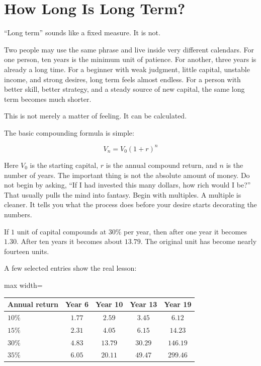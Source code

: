 \chapter{How Long Is Long Term?}

``Long term'' sounds like a fixed measure. It is not.

Two people may use the same phrase and live inside very different calendars. For one person, ten years is the minimum unit of patience. For another, three years is already a long time. For a beginner with weak judgment, little capital, unstable income, and strong desires, long term feels almost endless. For a person with better skill, better strategy, and a steady source of new capital, the same long term becomes much shorter.

This is not merely a matter of feeling. It can be calculated.

The basic compounding formula is simple:

\[
V_n=V_0(1+r)^n
\]

Here \(V_0\) is the starting capital, \(r\) is the annual compound return, and \(n\) is the number of years. The important thing is not the absolute amount of money. Do not begin by asking, ``If I had invested this many dollars, how rich would I be?'' That usually pulls the mind into fantasy. Begin with multiples. A multiple is cleaner. It tells you what the process does before your desire starts decorating the numbers.

If \(1\) unit of capital compounds at \(30\%\) per year, then after one year it becomes \(1.30\). After ten years it becomes about \(13.79\). The original unit has become nearly fourteen units.

A few selected entries show the real lesson:

\begin{center}
\begin{adjustbox}{max width=\linewidth}
\begin{tabular}{lcccc}
\hline
Annual return & Year 6 & Year 10 & Year 13 & Year 19 \\
\hline
\(10\%\) & \(1.77\) & \(2.59\) & \(3.45\) & \(6.12\) \\
\(15\%\) & \(2.31\) & \(4.05\) & \(6.15\) & \(14.23\) \\
\(30\%\) & \(4.83\) & \(13.79\) & \(30.29\) & \(146.19\) \\
\(35\%\) & \(6.05\) & \(20.11\) & \(49.47\) & \(299.46\) \\
\hline
\end{tabular}
\end{adjustbox}
\end{center}

